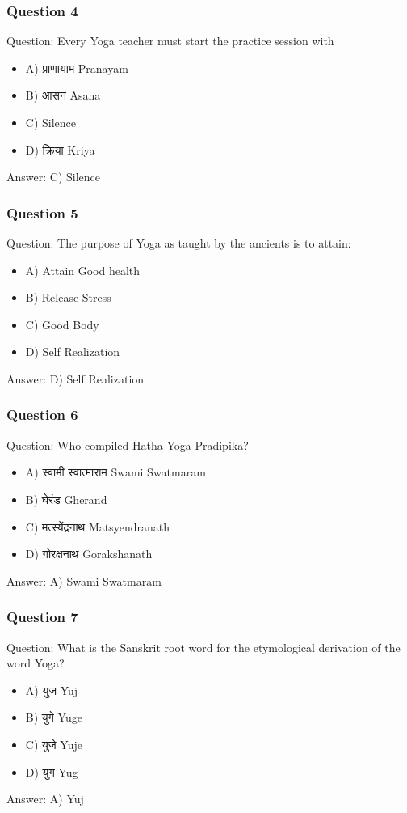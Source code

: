 \begin{frame}[fragile]\frametitle{Question 4}
Question: Every Yoga teacher must start the practice session with
\begin{itemize}
\item A) प्राणायाम Pranayam
\item B) आसन Asana
\item C) Silence
\item D) क्रिया Kriya
\end{itemize}
Answer: C) Silence
\end{frame}

\begin{frame}[fragile]\frametitle{Question 5}
Question: The purpose of Yoga as taught by the ancients is to attain:
\begin{itemize}
\item A) Attain Good health
\item B) Release Stress
\item C) Good Body
\item D) Self Realization
\end{itemize}
Answer: D) Self Realization
\end{frame}

\begin{frame}[fragile]\frametitle{Question 6}
Question: Who compiled Hatha Yoga Pradipika?
\begin{itemize}
\item A) स्वामी स्वात्माराम  Swami Swatmaram
\item B) घेरंड Gherand
\item C) मत्स्येंद्रनाथ  Matsyendranath
\item D) गोरक्षनाथ Gorakshanath
\end{itemize}
Answer: A) Swami Swatmaram
\end{frame}

\begin{frame}[fragile]\frametitle{Question 7}
Question: What is the Sanskrit root word for the etymological derivation of the word Yoga?
\begin{itemize}
\item A) युज Yuj
\item B) युगे  Yuge
\item C) युजे Yuje
\item D) युग  Yug
\end{itemize}
Answer: A) Yuj
\end{frame}

